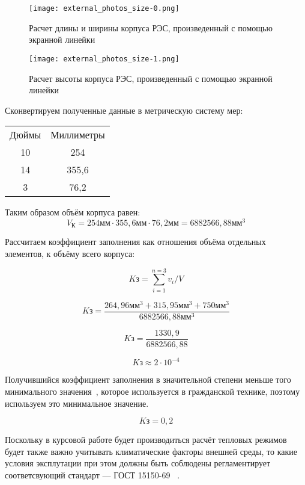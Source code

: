 \begin{figure}[h]
  \centering
  \texttt{[image: external\_photos\_size-0.png]}
  \caption{Расчет длины и ширины корпуса РЭС, произведенный с помощью
экранной линейки}
\end{figure}



\begin{figure}[h]
  \centering
  \texttt{[image: external\_photos\_size-1.png]}
  \caption{Расчет высоты корпуса РЭС, произведенный с помощью
экранной линейки}
\end{figure}
\newpage


\begin{table}
Сконвертируем полученные данные в метрическую систему мер:\\
  \centering
\begin{tabular}[b]{c | c}

    \hline
  Дюймы & Миллиметры \\ 
  10    & 254 \\
    14    & 355,6 \\
  3     & 76,2 \\

\end{tabular}
\end{table}

Таким образом объём корпуса равен:
$$V\mathrm{_К} = 254 \mathrm{мм} \cdot 355,6 \mathrm{мм} \cdot 76,2 \mathrm{мм} = 6882 566,88 \mathrm{мм^3}$$

Рассчитаем коэффициент заполнения как отношения объёма отдельных элементов, к объёму всего корпуса:

$$ K\mathrm{з} = \sum^{n=3}_{i=1} v_{i}/V$$

$$K\mathrm{з} = \frac{264,96 \mathrm{мм}^3 + 315,95 \mathrm{мм}^3 + 750 \mathrm{мм}^3}{6882 566,88 \mathrm{мм^3}} $$

$$K\mathrm{з} = \frac{1 330,9}{6882 566,88}$$

$$K\mathrm{з} \approx 2 \cdot 10^{-4}$$

Получившийся коэффициент заполнения в значительной степени меньше того
минимального значения~\cite{KP_POIMFP}, которое используется в
гражданской технике, поэтому используем это минимальное значение.

$$K\mathrm{з} = 0,2$$


Поскольку в курсовой работе будет производиться расчёт тепловых
режимов будет также важно учитывать климатические факторы внешней
среды, то какие условия эксплутации при этом должны быть соблюдены
регламентирует соответсвующий стандарт — ГОСТ 15150-69
~\cite{GOST_15150-69}.

